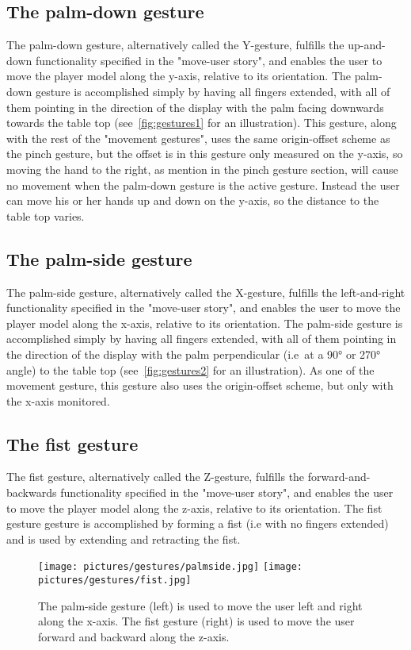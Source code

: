 \subsection{The palm-down gesture}
The palm-down gesture, alternatively called the Y-gesture, fulfills the up-and-down functionality specified in the "move-user story", and enables the user to 
move the player model along the y-axis, relative to its orientation. The palm-down gesture is accomplished simply by having all fingers extended, with all of them pointing in
the direction of the display with the palm facing downwards towards the table top (see~\vref{fig:gestures1} for an illustration). This gesture, along with the rest of the 
"movement gestures", uses the same origin-offset scheme as the pinch gesture, but the offset is in this gesture only measured on the y-axis, so moving the hand to the 
right, as mention in the pinch gesture section, will cause no movement when the palm-down gesture is the active gesture. 
Instead the user can move his or her hands up and down on the y-axis, so the distance to the table top varies.  

\subsection{The palm-side gesture}
The palm-side gesture, alternatively called the X-gesture, fulfills the left-and-right functionality specified in the "move-user story", and enables the user to 
move the player model along the x-axis, relative to its orientation. The palm-side gesture is accomplished simply by having all fingers extended, with all of them pointing in
the direction of the display with the palm perpendicular (i.e~at a 90° or 270° angle) to the table top (see~\vref{fig:gestures2} for an illustration). 
As one of the movement gesture, this gesture also uses the origin-offset scheme, but only with the x-axis monitored.

\subsection{The fist gesture}
The fist gesture, alternatively called the Z-gesture, fulfills the forward-and-backwards functionality specified in the "move-user story", and enables the user to 
move the player model along the z-axis, relative to its orientation. The fist gesture gesture is accomplished by forming a fist (i.e with no fingers extended)
and is used by extending and retracting the fist. 

\begin{figure}%
	\texttt{[image: pictures/gestures/palmside.jpg]}
    \texttt{[image: pictures/gestures/fist.jpg]}
	\caption[The palm-side and fist gestures]{The palm-side gesture (left) is used to move the user left and right along the x-axis. 
             The fist gesture (right) is used to move the user forward and backward along the z-axis.}
	\label{fig:gestures2}
\end{figure} 

